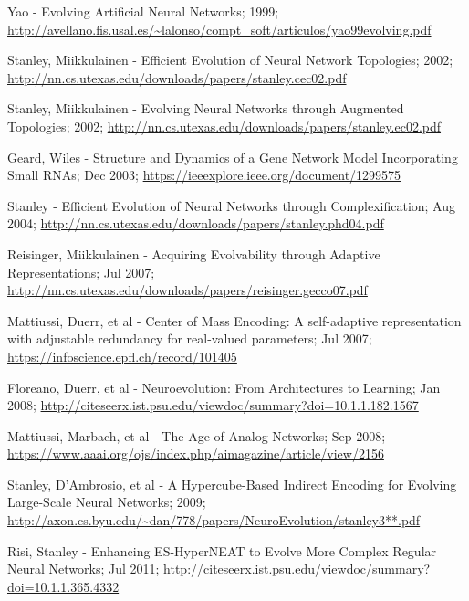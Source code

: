 \documentclass[journal, a4paper]{IEEEtran}
\begin{document}

\begin{thebibliography}{5}

    Yao - Evolving Artificial Neural Networks; 1999;
    \url{http://avellano.fis.usal.es/~lalonso/compt_soft/articulos/yao99evolving.pdf}

    Stanley, Miikkulainen - Efficient Evolution of Neural Network Topologies; 2002;
    \url{http://nn.cs.utexas.edu/downloads/papers/stanley.cec02.pdf}

    Stanley, Miikkulainen - Evolving Neural Networks through Augmented Topologies; 2002;
    \url{http://nn.cs.utexas.edu/downloads/papers/stanley.ec02.pdf}

    Geard, Wiles - Structure and Dynamics of a Gene Network Model Incorporating Small RNAs; Dec 2003;
    \url{https://ieeexplore.ieee.org/document/1299575}

    Stanley - Efficient Evolution of Neural Networks through Complexification; Aug 2004;
    \url{http://nn.cs.utexas.edu/downloads/papers/stanley.phd04.pdf}

    Reisinger, Miikkulainen - Acquiring Evolvability through Adaptive Representations; Jul 2007;
    \url{http://nn.cs.utexas.edu/downloads/papers/reisinger.gecco07.pdf}

    Mattiussi, Duerr, et al - Center of Mass Encoding: A self-adaptive representation with adjustable redundancy for real-valued parameters; Jul 2007;
    \url{https://infoscience.epfl.ch/record/101405}

    Floreano, Duerr, et al - Neuroevolution: From Architectures to Learning; Jan 2008;
    \url{http://citeseerx.ist.psu.edu/viewdoc/summary?doi=10.1.1.182.1567}

    Mattiussi, Marbach, et al - The Age of Analog Networks; Sep 2008;
    \url{https://www.aaai.org/ojs/index.php/aimagazine/article/view/2156}

    Stanley, D’Ambrosio, et al - A Hypercube-Based Indirect Encoding for Evolving Large-Scale Neural Networks; 2009;
    \url{http://axon.cs.byu.edu/~dan/778/papers/NeuroEvolution/stanley3**.pdf}

    Risi, Stanley - Enhancing ES-HyperNEAT to Evolve More Complex Regular Neural Networks; Jul 2011;
    \url{http://citeseerx.ist.psu.edu/viewdoc/summary?doi=10.1.1.365.4332}


\end{thebibliography}
\end{document}
